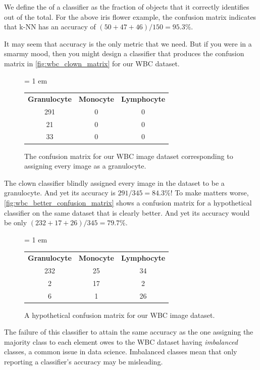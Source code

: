 We define the  of a classifier as the fraction of objects that it correctly identifies out of the total. For the above iris flower example, the confusion matrix indicates that k-NN has an accuracy of $(50 + 47 + 46)/150 = 95.3\%$.

It may seem that accuracy is the only metric that we need. But if you were in a smarmy mood, then you might design a classifier that produces the confusion matrix in \autoref{fig:wbc_clown_matrix} for our WBC dataset.\\

\begin{figure}[h]
\centering
\tabcolsep = 1 em
\mySfFamily
\begin{tabular}{c c c}
\textbf{Granulocyte} & \textbf{Monocyte} & \textbf{Lymphocyte} \\
291 & 0 & 0 \\
21 & 0 & 0 \\
33 & 0 & 0
\end{tabular}
\caption{The confusion matrix for our WBC image dataset corresponding to assigning every image as a granulocyte.}
\label{fig:wbc_clown_matrix}
\end{figure}

\begin{qbox}\end{qbox}

The clown classifier blindly assigned every image in the dataset to be a granulocyte. And yet its accuracy is $291/345 = 84.3\%$! To make matters worse, \autoref{fig:wbc_better_confusion_matrix} shows a confusion matrix for a hypothetical classifier on the same dataset that is clearly better. And yet its accuracy would be only $(232 + 17 + 26)/345 = 79.7\%$.\\

\begin{figure}[h]
\centering
\tabcolsep = 1 em
\mySfFamily
\begin{tabular}{c c c}
\textbf{Granulocyte} & \textbf{Monocyte} & \textbf{Lymphocyte} \\
232 & 25 & 34 \\
2 & 17 & 2 \\
6 & 1 & 26
\end{tabular}
\caption{A hypothetical confusion matrix for our WBC image dataset.}
\label{fig:wbc_better_confusion_matrix}
\end{figure}

The failure of this classifier to attain the same accuracy as the one assigning the majority class to each element owes to the WBC dataset having \textit{imbalanced} classes, a common issue in data science. Imbalanced classes mean that only reporting a classifier's accuracy may be misleading.

